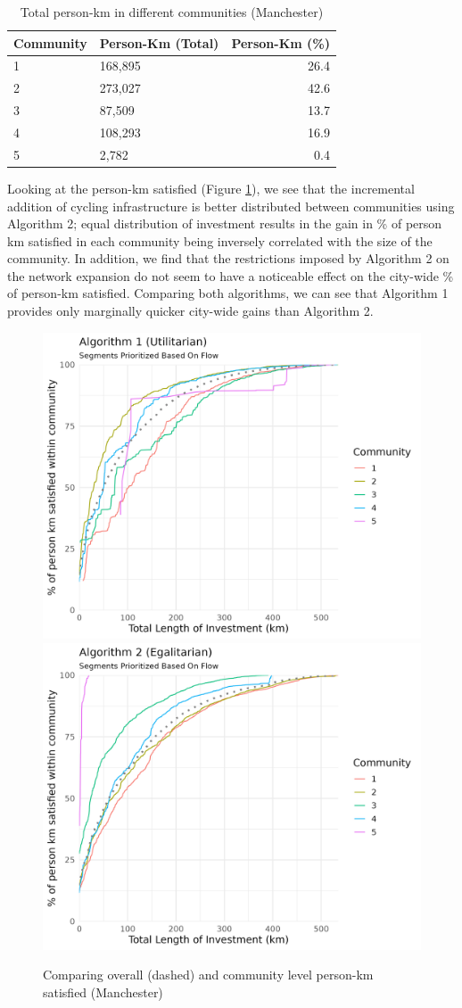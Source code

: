 \documentclass[
]{article}
\begin{document}
\begin{table}[!h]

\caption{\label{tab:personkmtable}Total person-km in different communities (Manchester)}
\centering
\begin{tabular}[t]{l|l|r}
\hline
Community & Person-Km (Total) & Person-Km (\%)\\
\hline
1 & 168,895 & 26.4\\
\hline
2 & 273,027 & 42.6\\
\hline
3 & 87,509 & 13.7\\
\hline
4 & 108,293 & 16.9\\
\hline
5 & 2,782 & 0.4\\
\hline
\end{tabular}
\end{table}

Looking at the person-km satisfied (Figure \ref{fig:growthtotal}), we
see that the incremental addition of cycling infrastructure is better
distributed between communities using Algorithm 2; equal distribution of
investment results in the gain in \% of person km satisfied in each
community being inversely correlated with the size of the community. In
addition, we find that the restrictions imposed by Algorithm 2 on the
network expansion do not seem to have a noticeable effect on the
city-wide \% of person-km satisfied. Comparing both algorithms, we can
see that Algorithm 1 provides only marginally quicker city-wide gains
than Algorithm 2.

\begin{figure}

{\centering \includegraphics[width=0.48\linewidth]{data/Manchester/Plots/Growth_Results/growth_utilitarian_satisfied_km_both_flow_column} \includegraphics[width=0.48\linewidth]{data/Manchester/Plots/Growth_Results/growth_egalitarian_satisfied_km_both_flow_column} 

}

\caption{Comparing overall (dashed) and community level person-km satisfied (Manchester)}\label{fig:growthtotal}
\end{figure}
\end{document}
